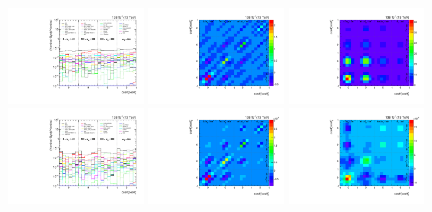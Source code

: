\begin{figure}[htb]
\begin{center}
 \includegraphics[width=0.32\textwidth]{fig_fullRun2UL/unfolding/combined/deltaSystCombinedlog_rebinnedB_c_nn_mttbar.pdf}
 \includegraphics[width=0.32\textwidth]{fig_fullRun2UL/unfolding/combined/StatCovMatrix_rebinnedB_c_nn_mttbar.pdf}
 \includegraphics[width=0.32\textwidth]{fig_fullRun2UL/unfolding/combined/TotalSystCovMatrix_rebinnedB_c_nn_mttbar.pdf} \\
 \includegraphics[width=0.32\textwidth]{fig_fullRun2UL/unfolding/combined/deltaSystCombinedlogNorm_rebinnedB_c_nn_mttbar.pdf}
 \includegraphics[width=0.32\textwidth]{fig_fullRun2UL/unfolding/combined/StatCovMatrixNorm_rebinnedB_c_nn_mttbar.pdf}
 \includegraphics[width=0.32\textwidth]{fig_fullRun2UL/unfolding/combined/TotalSystCovMatrixNorm_rebinnedB_c_nn_mttbar.pdf} \\

\end{center}
\end{figure}
